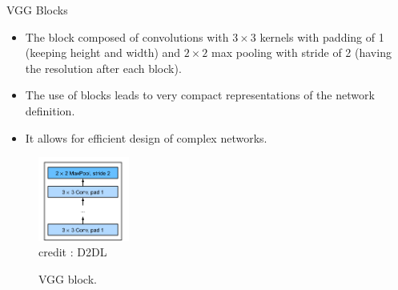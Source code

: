 \begin{vbframe}{VGG Blocks}
  \begin{itemize}
    \item The block composed of convolutions with $3 \times 3$  kernels with padding of 1 (keeping height and width) and $2 \times 2$  max pooling with stride of 2 (having the resolution after each block).
    \item The use of blocks leads to very compact representations of the network definition. 
    \item It allows for efficient design of complex networks.
  \end{itemize}
  
    \begin{figure}
  \centering
    \includegraphics[width=3cm]{plots/moderncnn/vggblock.png}
    \tiny{\\ credit : D2DL}
    \caption{VGG block.}
  \end{figure}
  
\end{vbframe}



